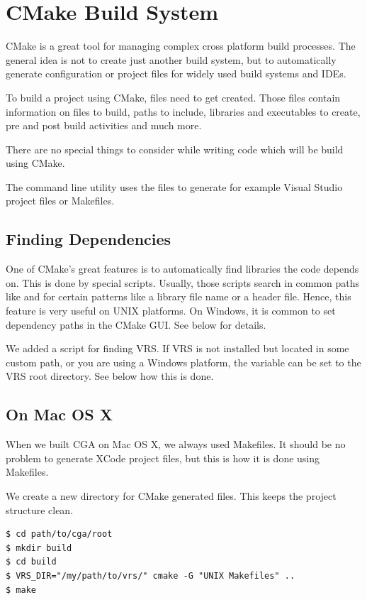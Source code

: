 
\section{CMake Build System} CMake is a great tool for managing complex cross platform build processes. The general idea is not to create just another build system, but to automatically generate configuration or project files for widely used build systems and IDEs.

To build a project using CMake,  files need to get created. Those files contain information on files to build, paths to include, libraries and executables to create, pre and post build activities and much more.

There are no special things to consider while writing code which will be build using CMake.

The  command line utility uses the  files to generate for example Visual Studio project files or Makefiles.

\subsection{Finding Dependencies} One of CMake's great features is to automatically find libraries the code depends on. This is done by special scripts. Usually, those scripts search in common paths like  and  for certain patterns like a library file name or a header file. Hence, this feature is very useful on UNIX platforms. On Windows, it is common to set dependency paths in the CMake GUI. See below for details.

We added a script for finding VRS. If VRS is not installed but located in some custom path, or you are using a Windows platform, the variable  can be set to the VRS root directory. See below how this is done.

\subsection{On Mac OS X} When we built CGA on Mac OS X, we always used Makefiles. It should be no problem to generate XCode project files, but this is how it is done using Makefiles.

We create a new directory for CMake generated files. This keeps the project structure clean.
\begin{verbatim}
$ cd path/to/cga/root
$ mkdir build
$ cd build
$ VRS_DIR="/my/path/to/vrs/" cmake -G "UNIX Makefiles" ..
$ make
\end{verbatim}

